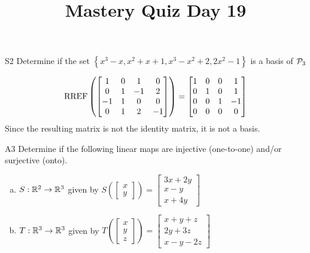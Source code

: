 \documentclass{sbgLAquiz}
\title{Mastery Quiz Day 19 }
\begin{document}
\begin{problem}{S2}
Determine if the set $\left\{ x^3-x, x^2+x+1, x^3-x^2+2, 2x^2-1 \right\}$ is a basis of $\P_3$
\end{problem}
\begin{solution}
$$\RREF\left(\begin{bmatrix} 1 & 0 & 1 & 0 \\ 0 & 1 & -1 & 2 \\ -1 & 1 & 0 & 0 \\ 0 & 1 & 2 & -1 \end{bmatrix} \right)= \begin{bmatrix} 1 & 0 &0 & 1 \\ 0 & 1 & 0 & 1 \\ 0 & 0 & 1 & -1 \\ 0 & 0 & 0 & 0 \end{bmatrix}$$
Since the resulting matrix is not the identity matrix, it is not a basis.
\end{solution}


\begin{problem}{A3}
Determine if the following linear maps are injective (one-to-one) and/or surjective (onto).
\begin{enumerate}[(a)]
\item $S: \IR^2 \rightarrow \IR^3$ given by $S\left(\begin{bmatrix} x \\ y  \end{bmatrix} \right) = \begin{bmatrix} 3x+2y \\ x-y \\ x+4y \end{bmatrix} $
\item $T: \IR^3 \rightarrow \IR^3$ given by $T\left(\begin{bmatrix} x \\ y \\ z  \end{bmatrix} \right) = \begin{bmatrix} x+y+z \\ 2y+3z \\ x-y-2z \end{bmatrix} $
\end{enumerate}
\end{problem}
\end{document}
